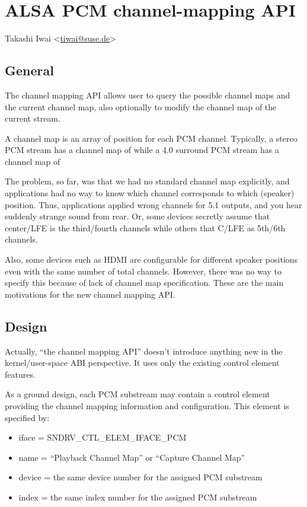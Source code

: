 \documentclass[a4paper,8pt,english]{sphinxmanual}
\begin{document}
\section{ALSA PCM channel-mapping API}
\label{sound/designs/channel-mapping-api:alsa-pcm-channel-mapping-api}\label{sound/designs/channel-mapping-api::doc}
Takashi Iwai \textless{}\href{mailto:tiwai@suse.de}{tiwai@suse.de}\textgreater{}


\subsection{General}
\label{sound/designs/channel-mapping-api:general}
The channel mapping API allows user to query the possible channel maps
and the current channel map, also optionally to modify the channel map
of the current stream.

A channel map is an array of position for each PCM channel.
Typically, a stereo PCM stream has a channel map of
while a 4.0 surround PCM stream has a channel map of

The problem, so far, was that we had no standard channel map
explicitly, and applications had no way to know which channel
corresponds to which (speaker) position.  Thus, applications applied
wrong channels for 5.1 outputs, and you hear suddenly strange sound
from rear.  Or, some devices secretly assume that center/LFE is the
third/fourth channels while others that C/LFE as 5th/6th channels.

Also, some devices such as HDMI are configurable for different speaker
positions even with the same number of total channels.  However, there
was no way to specify this because of lack of channel map
specification.  These are the main motivations for the new channel
mapping API.


\subsection{Design}
\label{sound/designs/channel-mapping-api:design}
Actually, ``the channel mapping API'' doesn't introduce anything new in
the kernel/user-space ABI perspective.  It uses only the existing
control element features.

As a ground design, each PCM substream may contain a control element
providing the channel mapping information and configuration.  This
element is specified by:
\begin{itemize}
\item {} 
iface = SNDRV\_CTL\_ELEM\_IFACE\_PCM

\item {} 
name = ``Playback Channel Map'' or ``Capture Channel Map''

\item {} 
device = the same device number for the assigned PCM substream

\item {} 
index = the same index number for the assigned PCM substream

\end{itemize}
\end{document}
